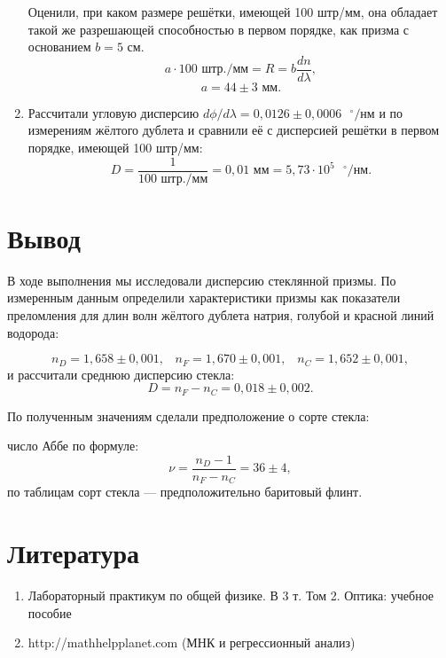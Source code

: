 \documentclass[a4paper, 12pt]{article}%
\begin{document}
\begin{enumerate}
	Оценили, при каком размере решётки, имеющей 100 штр/мм, она обладает такой же разрешающей способностью в первом порядке, как призма с основанием $b = 5$ см.
	\begin{equation*}
	a\cdot100\text{ штр./мм} = R = b\dfrac{dn}{d\lambda},
	\end{equation*}
	\begin{equation*}
	a = 44\pm3 \text{ мм}.
	\end{equation*}
	\item Рассчитали угловую дисперсию $d\phi/d\lambda = 0{,}0126\pm0{,}0006\text{ }^\circ\text{/нм}$ и по измерениям жёлтого дублета и сравнили её с дисперсией решётки в первом порядке, имеющей 100 штр/мм:
	\begin{equation*}
	D = \dfrac{1}{100\text{ штр./мм}} = 0{,}01\text{ мм} = 5{,}73\cdot10^5\text{ }^\circ\text{/нм}.
	\end{equation*}
\end{enumerate}

\section*{Вывод}

В ходе выполнения мы исследовали дисперсию стеклянной призмы. По измеренным данным определили  характеристики призмы как показатели преломления для длин волн жёлтого дублета натрия, голубой и красной линий водорода:

\begin{equation*}
	n_D = 1{,}658\pm0{,}001,\;\;\;n_F = 1{,}670\pm0{,}001,\;\;\;n_C = 1{,}652\pm0{,}001,
	\end{equation*}
и рассчитали среднюю дисперсию стекла:
	\begin{equation*}
		D = n_F - n_C = 0{,}018\pm0{,}002.
	\end{equation*}

По полученным значениям сделали предположение о сорте стекла:

число Аббе по формуле:
	\begin{equation*}
	\nu = \dfrac{n_D - 1}{n_F - n_C} = 36\pm 4,
	\end{equation*}
	 по таблицам сорт стекла --- предположительно баритовый флинт.

\section{Литература}

\begin{enumerate}

\item Лабораторный практикум по общей физике. В 3 т. Том 2. Оптика: учебное пособие

\item http://mathhelpplanet.com (МНК и регрессионный анализ)


\end{enumerate}	
\end{document}
